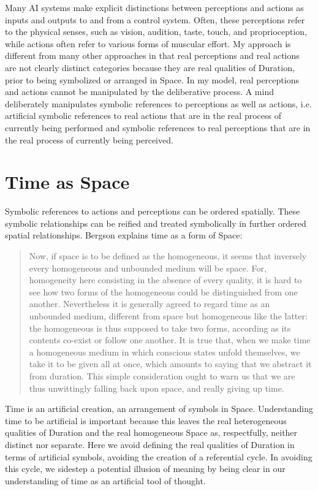 Many AI systems make explicit distinctions between perceptions and
actions as inputs and outputs to and from a control system.  Often,
these perceptions refer to the physical senses, such as vision,
audition, taste, touch, and proprioception, while actions often refer
to various forms of muscular effort.  My approach is different from
many other approaches in that real perceptions and real actions are
not clearly distinct categories because they are real qualities of
Duration, prior to being symbolized or arranged in Space.  In my
model, real perceptions and actions cannot be manipulated by the
deliberative process.  A mind deliberately manipulates symbolic
references to perceptions as well as actions, i.e. artificial symbolic
references to real actions that are in the real process of currently
being performed and symbolic references to real perceptions that are
in the real process of currently being perceived.

\section{Time as Space}

Symbolic references to actions and perceptions can be ordered
spatially.  These symbolic relationships can be reified and treated
symbolically in further ordered spatial relationships.  Bergson
explains time as a form of Space:

\begin{quote}
Now, if space is to be defined as the homogeneous, it seems that
inversely every homogeneous and unbounded medium will be space.  For,
homogeneity here consisting in the absence of every quality, it is
hard to see how two forms of the homogeneous could be distinguished
from one another.  Nevertheless it is generally agreed to regard time
as an unbounded medium, different from space but homogeneous like the
latter: the homogeneous is thus supposed to take two forms, according
as its contents co-exist or follow one another.  It is true that, when
we make time a homogeneous medium in which conscious states unfold
themselves, we take it to be given all at once, which amounts to
saying that we abstract it from duration.  This simple consideration
ought to warn us that we are thus unwittingly falling back upon space,
and really giving up time.
\end{quote}

Time is an artificial creation, an arrangement of symbols in Space.
Understanding time to be artificial is important because this leaves
the real heterogeneous qualities of Duration and the real homogeneous
Space as, respectfully, neither distinct nor separate.  Here we avoid
defining the real qualities of Duration in terms of artificial
symbols, avoiding the creation of a referential cycle.  In avoiding
this cycle, we sidestep a potential illusion of meaning by being clear
in our understanding of time as an artificial tool of thought.

